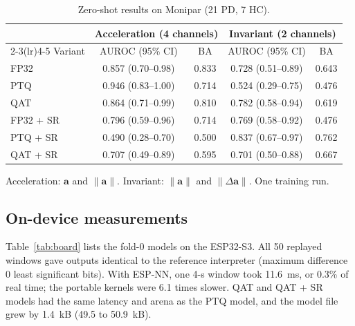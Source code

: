 \documentclass[preprint,12pt]{elsarticle}
\begin{document}
\begin{table}[!t]
\caption{Zero-shot results on Monipar (21 PD, 7 HC).}
\label{tab:monipar}
\centering\small
\begin{tabular}{@{}lcccc@{}}
\toprule
 & \multicolumn{2}{c}{Acceleration (4 channels)} & \multicolumn{2}{c}{Invariant (2 channels)} \\
\cmidrule(lr){2-3}\cmidrule(lr){4-5}
Variant & AUROC (95\% CI) & BA & AUROC (95\% CI) & BA \\
\midrule
FP32 & 0.857 (0.70--0.98) & 0.833 & 0.728 (0.51--0.89) & 0.643 \\
PTQ & 0.946 (0.83--1.00) & 0.714 & 0.524 (0.29--0.75) & 0.476 \\
QAT & 0.864 (0.71--0.99) & 0.810 & 0.782 (0.58--0.94) & 0.619 \\
FP32 + SR & 0.796 (0.59--0.96) & 0.714 & 0.769 (0.58--0.92) & 0.476 \\
PTQ + SR & 0.490 (0.28--0.70) & 0.500 & 0.837 (0.67--0.97) & 0.762 \\
QAT + SR & 0.707 (0.49--0.89) & 0.595 & 0.701 (0.50--0.88) & 0.667 \\
\bottomrule
\end{tabular}

\vspace{2pt}\parbox{\linewidth}{\footnotesize Acceleration: $\mathbf{a}$ and $\|\mathbf{a}\|$. Invariant: $\|\mathbf{a}\|$ and $\|\Delta\mathbf{a}\|$. One training run.}
\end{table}

\subsection{On-device measurements}
Table~\ref{tab:board} lists the fold-0 models on the ESP32-S3. All 50 replayed windows gave outputs identical to the reference interpreter (maximum difference 0 least significant bits). With ESP-NN, one 4-s window took 11.6~ms, or 0.3\% of real time; the portable kernels were 6.1 times slower. QAT and QAT + SR models had the same latency and arena as the PTQ model, and the model file grew by 1.4~kB (49.5 to 50.9~kB).
\end{document}
